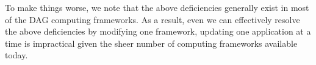 

To make things worse, we note that the above deficiencies generally exist in most of the DAG computing frameworks. 
As a result, even we can effectively resolve the above deficiencies by modifying one framework, updating one application at a time is impractical given the sheer number of computing frameworks available today.


